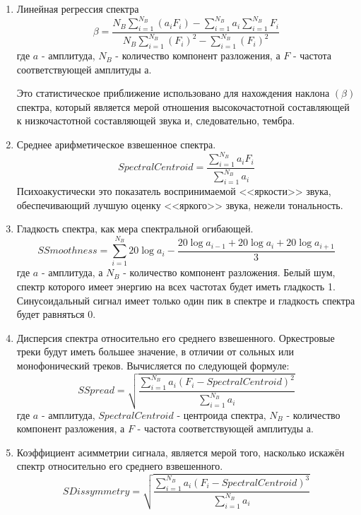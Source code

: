 \begin{enumerate}[label=\arabic*.]
\item Линейная регрессия спектра
\begin{equation}\label{eq:regression}
\beta = \frac{ N_B \sum\limits_{i=1}^{N_B} (a_i F_i) -  \sum\limits_{i=1}^{N_B} a_i  \sum\limits_{i=1}^{N_B} F_i}{N_B\sum\limits_{i=1}^{N_B} (F_i)^2 - \sum\limits_{i=1}^{N_B} (F_i)^2 }
\end{equation}
где $a$ - амплитуда,  $N_B$ - количество компонент разложения, а $F$ - частота соответствующей амплитуды $а$.

Это статистическое приближение использовано для нахождения наклона $(\beta)$ спектра, который является мерой отношения высокочастотной составляющей к низкочастотной составляющей звука и, следовательно, тембра. 
\item Среднее арифметическое взвешенное спектра.
\begin{equation}\label{eq:centroid}
SpectralCentroid = \frac{\sum \limits_{i=1}^{N_B} a_i F_i}{\sum \limits_{i=1}^{N_B} a_i}  
\end{equation}  
Психоакустически это показатель воспринимаемой <<яркости>> звука, обеспечивающий лучшую оценку <<яркого>> звука, нежели тональность.
\item Гладкость спектра, как мера спектральной огибающей.
\begin{equation}\label{eq:smooth}
SSmoothness = \sum \limits_{i=1}^{N_B} 20 \log a_i - \frac{20 \log a_{i-1} + 20 \log a_i + 20 \log a_{i+1}}{3} 
\end{equation}  
где $ a $ - амплитуда,  а $N_B$ - количество компонент разложения. 
Белый шум, спектр которого имеет энергию на всех частотах будет иметь гладкость 1. Синусоидальный сигнал имеет только один пик в спектре и гладкость спектра будет равняться 0. 
\item Дисперсия спектра относительно его среднего взвешенного.  Оркестровые треки будут иметь большее значение, в отличии от сольных или  монофонический треков. Вычисляется по следующей формуле:  
\begin{equation}\label{eq:spread}
SSpread = \sqrt{\frac{ \sum \limits_{i=1}^{N_B} a_i ( F_i - SpectralCentroid)^2 }{\sum \limits_{i=1}^{N_B} a_i}} 
\end{equation}  
где $a$ - амплитуда, $SpectralCentroid$ - центроида спектра,  $N_B$ - количество компонент разложения, а $F$ - частота соответствующей амплитуды $ а $.
\item Коэффициент асимметрии сигнала, является мерой того, насколько искажён спектр относительно  его среднего взвешенного.
\begin{equation}\label{eq:Dissymmetry}
SDissymmetry = \sqrt{\frac{ \sum \limits_{i=1}^{N_B} a_i ( F_i - SpectralCentroid)^3 }{\sum \limits_{i=1}^{N_B} a_i}} 
\end{equation}  
\end{enumerate}


